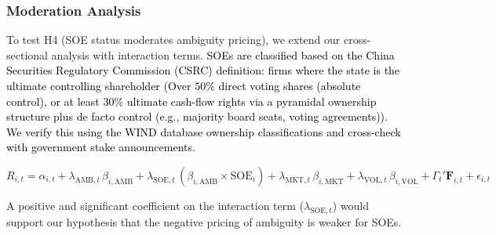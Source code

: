 \documentclass[preprint,12pt,authoryear]{elsarticle}
\begin{document}
\subsubsection{Moderation Analysis}

To test H4 (SOE status moderates ambiguity pricing), we extend our cross-sectional analysis with interaction terms. \textcolor{black}{SOEs are classified based on the China Securities Regulatory Commission (CSRC) definition: firms where the state is the ultimate controlling shareholder (Over $50\%$ direct voting shares (absolute control), or at least $30\%$ ultimate cash-flow rights via a pyramidal ownership structure plus de facto control (e.g., majority board seats, voting agreements)). We verify this using the WIND database ownership classifications and cross-check with government stake announcements.}

\begin{equation}
R_{i,t} = \alpha_{i,t} + \lambda_{\text{AMB},t} \, \beta_{i,\text{AMB}} + \lambda_{\text{SOE},t} \, (\beta_{i,\text{AMB}} \times \text{SOE}_i) + \lambda_{\text{MKT},t} \, \beta_{i,\text{MKT}} + \lambda_{\text{VOL},t} \, \beta_{i,\text{VOL}} + \Gamma_{t}' \mathbf{F}_{i,t} + \epsilon_{i,t}
\end{equation}

A positive and significant coefficient on the interaction term ($\lambda_{\text{SOE},t}$) would support our hypothesis that the negative pricing of ambiguity is weaker for SOEs.
\end{document}

